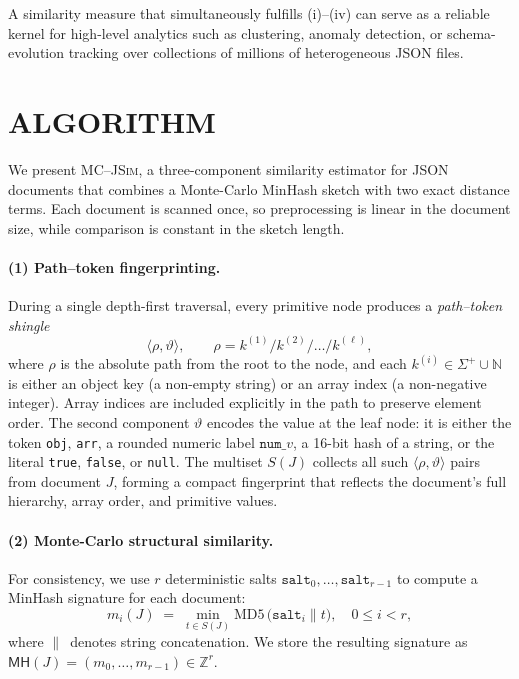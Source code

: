 \documentclass[sigconf]{acmart}
\begin{document}
A similarity measure that simultaneously fulfills (i)–(iv) can serve as a reliable kernel for high-level analytics such as clustering, anomaly detection, or schema-evolution tracking over collections of millions of heterogeneous JSON files.


\section{ALGORITHM}
\label{sec:algorithm}

We present \textsc{MC--JSim}, a three-component similarity estimator for JSON
documents that combines a Monte-Carlo MinHash sketch with two exact
distance terms.  Each document is scanned once, so preprocessing is linear in
the document size, while comparison is constant in the sketch length.

\paragraph{(1) Path–token fingerprinting.}
During a single depth-first traversal, every primitive node produces a  
\emph{path–token shingle}
\[
  \langle \rho, \vartheta \rangle, \qquad
  \rho = k^{(1)} / k^{(2)} / \dots / k^{(\ell)},
\]
where \(\rho\) is the absolute path from the root to the node, and each  
\(k^{(i)} \in \Sigma^{+} \cup \mathbb{N}\)  
is either an object key (a non-empty string) or an array index (a non-negative integer).  
Array indices are included explicitly in the path to preserve element order.  
The second component \(\vartheta\) encodes the value at the leaf node:  
it is either the token \texttt{obj}, \texttt{arr},  
a rounded numeric label \(\texttt{num\_}v\),  
a 16-bit hash of a string, or the literal \texttt{true}, \texttt{false}, or \texttt{null}. The multiset \(S(J)\) collects all such \(\langle \rho, \vartheta \rangle\) pairs from document \(J\), forming a compact fingerprint that reflects the document's full hierarchy, array order, and primitive values.

\paragraph{(2) Monte-Carlo structural similarity.}
For consistency, we use \(r\) deterministic salts  
\(\texttt{salt}_{0},\dots ,\texttt{salt}_{r-1}\)  
to compute a MinHash signature for each document:
\[
  m_{i}(J) \;=\;
  \min_{t\in S(J)} 
      \text{MD5}\hspace{2pt}\!\bigl(\texttt{salt}_{i} \| t\bigr),
  \quad 0 \le i < r,
\]
where \(\|\,\) denotes string concatenation.  
We store the resulting signature as  
\(\mathsf{MH}(J) = (m_{0}, \dots, m_{r-1})\in\mathbb{Z}^{r}\).
\end{document}
